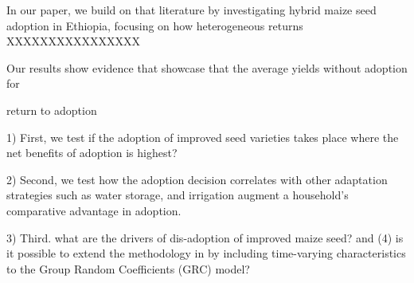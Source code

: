 \documentclass{article}
\begin{document}
In our paper, we build on that literature by investigating hybrid maize seed adoption in Ethiopia, focusing on how heterogeneous returns XXXXXXXXXXXXXXXX



Our results show evidence that showcase that the average yields without adoption for 

return to adoption



1) First, we test if the adoption of improved seed varieties takes place where the net benefits of adoption is highest? 

2) Second, we test how the adoption decision correlates with other adaptation strategies such as water storage, and irrigation augment a household’s comparative advantage in adoption.

3) Third. what are the drivers of dis-adoption of improved maize seed? and (4) is it possible to extend the methodology in \citep{Tjernstrom_Emilia_Dalia_Ghanem_Oscar_Barriga_Cabanillas_Travis_J_Lybbert_Jeffrey_D_Michler_and_Aleksandr_Michuda2020-bc} by including time-varying characteristics to the Group Random Coefficients (GRC) model?


\end{document}
